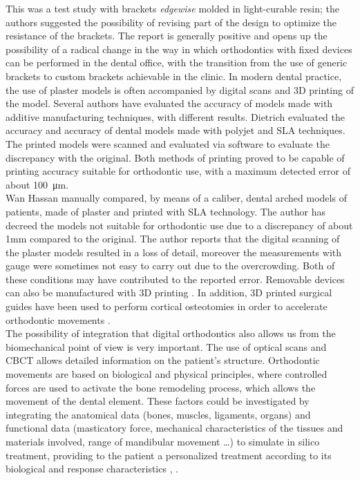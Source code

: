 This was a test study with brackets \emph{edgewise} molded in light-curable resin; the authors suggested the possibility of revising part of the design to optimize the resistance of the brackets. The report is generally positive and opens up the possibility of a radical change in the way in which orthodontics with fixed devices can be performed in the dental office, with the transition from the use of generic brackets to custom brackets achievable in the clinic.
In modern dental practice, the use of plaster models is often accompanied by digital scans and 3D printing of the model. Several authors have evaluated the accuracy of models made with additive manufacturing techniques, with different results. Dietrich \parencite{Reference112} evaluated the accuracy and accuracy of dental models made with polyjet and SLA techniques. The printed models were scanned and evaluated via software to evaluate the discrepancy with the original. Both methods of printing proved to be capable of printing accuracy suitable for orthodontic use, with a maximum detected error of about \SI{100}{\micro\metre}. \\
Wan Hassan \parencite{Reference113} manually compared, by means of a caliber, dental arched models of patients, made of plaster and printed with SLA technology. The author has decreed the models not suitable for orthodontic use due to a discrepancy of about 1mm compared to the original. The author reports that the digital scanning of the plaster models resulted in a loss of detail, moreover the measurements with gauge were sometimes not easy to carry out due to the overcrowding. Both of these conditions may have contributed to the reported error. Removable devices can also be manufactured with 3D printing \parencite{Reference111}. In addition, 3D printed surgical guides have been used to perform cortical osteotomies in order to accelerate orthodontic movements \parencite{Reference114}. \\
The possibility of integration that digital orthodontics also allows us from the biomechanical point of view is very important. The use of optical scans and CBCT allows detailed information on the patient's structure. Orthodontic movements are based on biological and physical principles, where controlled forces are used to activate the bone remodeling process, which allows the movement of the dental element. These factors could be investigated by integrating the anatomical data (bones, muscles, ligaments, organs) and functional data (masticatory force, mechanical characteristics of the tissues and materials involved, range of mandibular movement \ldots) to simulate in silico treatment, providing to the patient a personalized treatment according to its biological and response characteristics \parencite{Reference110}, \parencite{Reference140}.
